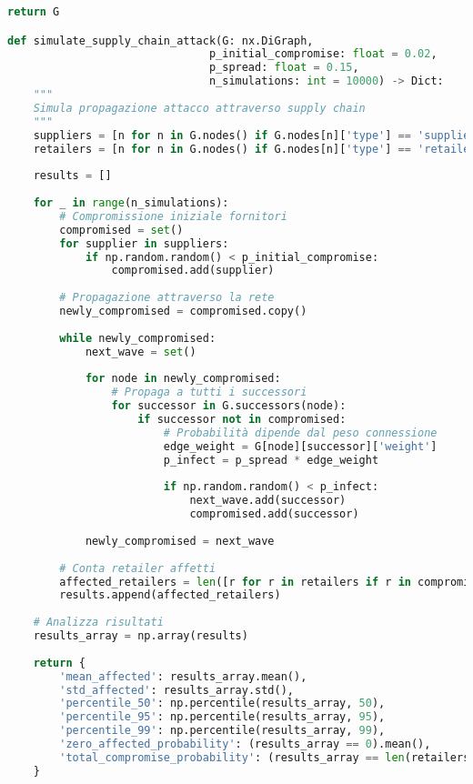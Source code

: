 \begin{lstlisting}[language=Python, caption=Simulazione Contagio Supply Chain]
    return G

def simulate_supply_chain_attack(G: nx.DiGraph, 
                               p_initial_compromise: float = 0.02,
                               p_spread: float = 0.15,
                               n_simulations: int = 10000) -> Dict:
    """
    Simula propagazione attacco attraverso supply chain
    """
    suppliers = [n for n in G.nodes() if G.nodes[n]['type'] == 'supplier']
    retailers = [n for n in G.nodes() if G.nodes[n]['type'] == 'retailer']
    
    results = []
    
    for _ in range(n_simulations):
        # Compromissione iniziale fornitori
        compromised = set()
        for supplier in suppliers:
            if np.random.random() < p_initial_compromise:
                compromised.add(supplier)
        
        # Propagazione attraverso la rete
        newly_compromised = compromised.copy()
        
        while newly_compromised:
            next_wave = set()
            
            for node in newly_compromised:
                # Propaga a tutti i successori
                for successor in G.successors(node):
                    if successor not in compromised:
                        # Probabilità dipende dal peso connessione
                        edge_weight = G[node][successor]['weight']
                        p_infect = p_spread * edge_weight
                        
                        if np.random.random() < p_infect:
                            next_wave.add(successor)
                            compromised.add(successor)
            
            newly_compromised = next_wave
        
        # Conta retailer affetti
        affected_retailers = len([r for r in retailers if r in compromised])
        results.append(affected_retailers)
    
    # Analizza risultati
    results_array = np.array(results)
    
    return {
        'mean_affected': results_array.mean(),
        'std_affected': results_array.std(),
        'percentile_50': np.percentile(results_array, 50),
        'percentile_95': np.percentile(results_array, 95),
        'percentile_99': np.percentile(results_array, 99),
        'zero_affected_probability': (results_array == 0).mean(),
        'total_compromise_probability': (results_array == len(retailers)).mean()
    }
\end{lstlisting}

